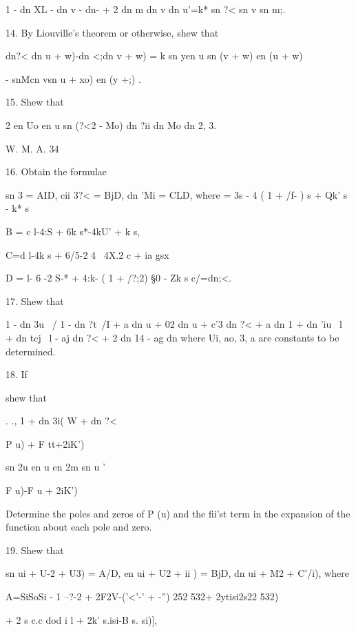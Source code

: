 1 - dn XL - dn v - dn-  + 2 dn m dn v dn u'=k* sn ?< sn v sn m;.


14. By Liouville's theorem or otherwise, shew that

dn?< dn u + w)-dn <;dn v + w) = k sn yen u sn (v + w) en (u + w)

- snMcn vsn u + xo) en (y +;) .


15. Shew that

2 en Uo en u sn (?<2 - %
Mo) dn ?ii dn Mo dn %
2, 3. 

W. M. A. 34

%
%

16. Obtain the formulae

sn 3 = AID, cii 3?< = BjD, dn 'Mi = CLD, where = 3s - 4 ( 1 + /f- ) s
+ Qk' s - k* s%

B = c l-4:S + 6k s*-4kU' + k s,

C=d l-4k s + 6/5-2 4 \ 4X.2 c + ia gsx

D = l- 6 -2 S-* + 4:k- ( 1 + /?;2) §0 - Zk s%
c/=dn;<.

17. Shew that

1 - dn 3u \ / 1 - dn ?t\ /I + a dn u + 02 dn u + c'3 dn ?< + a dn 1 +
dn 'iu \ l + dn tcj \ l - aj dn ?< + 2 dn 14 - ag dn %
where Ui, ao, 3, a are constants to be determined. 

18. If

shew that

  . ., 1 + dn 3i( W + dn ?<

P u) + F tt+2iK')

sn 2u en u en 2m sn u '

F u)-F u + 2iK')

Determine the poles and zeros of P (u) and the fii'st term in the
expansion of the function about each pole and zero.


19. Shew that

sn ui + U-2 + U3) = A/D, en ui + U2 + ii ) = BjD, dn ui + M2 + %
C'/i), where

A=SiSoSi - 1 --?-2 + 2F2V-('<'-' + -'') 252 532+ 2ytisi2s22 532)

+ 2 s c.c dod i l + 2k' s.isi-B s. si)],

